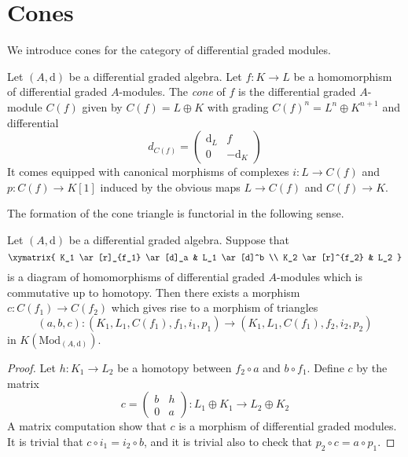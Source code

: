 \section{Cones}
\label{section-cones}

\noindent
We introduce cones for the category of differential graded modules.

\begin{definition}
\label{definition-cone}
Let $(A, \text{d})$ be a differential graded algebra.
Let $f : K \to L$ be a homomorphism of differential graded $A$-modules.
The {\it cone} of $f$ is the differential graded $A$-module
$C(f)$ given by $C(f) = L \oplus K$ with grading
$C(f)^n = L^n \oplus K^{n + 1}$ and
differential
$$
d_{C(f)} =
\left(
\begin{matrix}
\text{d}_L & f \\
0 & -\text{d}_K
\end{matrix}
\right)
$$
It comes equipped with canonical morphisms of complexes $i : L \to C(f)$
and $p : C(f) \to K[1]$ induced by the obvious maps $L \to C(f)$
and $C(f) \to K$.
\end{definition}

\noindent
The formation of the cone triangle is functorial in the following sense.

\begin{lemma}
\label{lemma-functorial-cone}
Let $(A, \text{d})$ be a differential graded algebra.
Suppose that
$$
\xymatrix{
K_1 \ar[r]_{f_1} \ar[d]_a & L_1 \ar[d]^b \\
K_2 \ar[r]^{f_2} & L_2
}
$$
is a diagram of homomorphisms of differential graded $A$-modules which is
commutative up to homotopy.
Then there exists a morphism $c : C(f_1) \to C(f_2)$ which gives rise to
a morphism of triangles
$$
(a, b, c) : (K_1, L_1, C(f_1), f_1, i_1, p_1) \to
(K_1, L_1, C(f_1), f_2, i_2, p_2)
$$
in $K(\text{Mod}_{(A, \text{d})})$.
\end{lemma}

\begin{proof}
Let $h : K_1 \to L_2$ be a homotopy between $f_2 \circ a$ and $b \circ f_1$.
Define $c$ by the matrix
$$
c =
\left(
\begin{matrix}
b & h \\
0 & a
\end{matrix}
\right) :
L_1 \oplus K_1 \to L_2 \oplus K_2
$$
A matrix computation show that $c$ is a morphism of differential
graded modules. It is trivial that $c \circ i_1 = i_2 \circ b$, and it is
trivial also to check that $p_2 \circ c = a \circ p_1$.
\end{proof}











